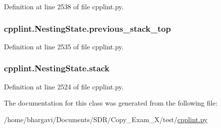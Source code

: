 Definition at line 2538 of file cpplint.\+py.

\subsubsection[{\texorpdfstring{previous\+\_\+stack\+\_\+top}{previous_stack_top}}]{\setlength{\rightskip}{0pt plus 5cm}cpplint.\+Nesting\+State.\+previous\+\_\+stack\+\_\+top}\hypertarget{classcpplint_1_1_nesting_state_a7aa34c8fb8df73d76f702c7012c46911}{}\label{classcpplint_1_1_nesting_state_a7aa34c8fb8df73d76f702c7012c46911}


Definition at line 2535 of file cpplint.\+py.

\subsubsection[{\texorpdfstring{stack}{stack}}]{\setlength{\rightskip}{0pt plus 5cm}cpplint.\+Nesting\+State.\+stack}\hypertarget{classcpplint_1_1_nesting_state_a6ae9bea040f988d152922788d0d73a15}{}\label{classcpplint_1_1_nesting_state_a6ae9bea040f988d152922788d0d73a15}


Definition at line 2524 of file cpplint.\+py.



The documentation for this class was generated from the following file\+:\begin{DoxyCompactItemize}
\item 
/home/bhargavi/\+Documents/\+S\+D\+R/\+Copy\+\_\+\+Exam\+\_\+X/test/\hyperlink{cpplint_8py}{cpplint.\+py}\end{DoxyCompactItemize}
